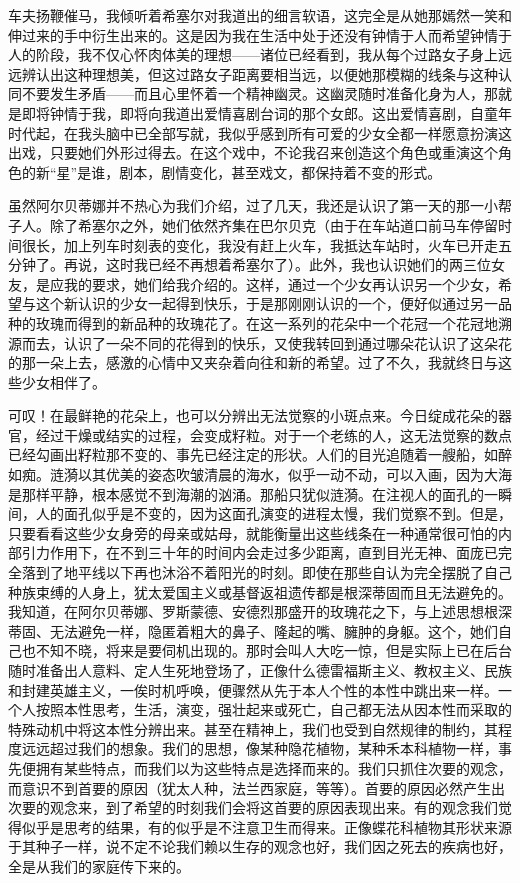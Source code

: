 \par 车夫扬鞭催马，我倾听着希塞尔对我道出的细言软语，这完全是从她那嫣然一笑和伸过来的手中衍生出来的。这是因为我在生活中处于还没有钟情于人而希望钟情于人的阶段，我不仅心怀肉体美的理想——诸位已经看到，我从每个过路女子身上远远辨认出这种理想美，但这过路女子距离要相当远，以便她那模糊的线条与这种认同不要发生矛盾——而且心里怀着一个精神幽灵。这幽灵随时准备化身为人，那就是即将钟情于我，即将向我道出爱情喜剧台词的那个女郎。这出爱情喜剧，自童年时代起，在我头脑中已全部写就，我似乎感到所有可爱的少女全都一样愿意扮演这出戏，只要她们外形过得去。在这个戏中，不论我召来创造这个角色或重演这个角色的新“星”是谁，剧本，剧情变化，甚至戏文，都保持着不变的形式。
\par 虽然阿尔贝蒂娜并不热心为我们介绍，过了几天，我还是认识了第一天的那一小帮子人。除了希塞尔之外，她们依然齐集在巴尔贝克（由于在车站道口前马车停留时间很长，加上列车时刻表的变化，我没有赶上火车，我抵达车站时，火车已开走五分钟了。再说，这时我已经不再想着希塞尔了）。此外，我也认识她们的两三位女友，是应我的要求，她们给我介绍的。这样，通过一个少女再认识另一个少女，希望与这个新认识的少女一起得到快乐，于是那刚刚认识的一个，便好似通过另一品种的玫瑰而得到的新品种的玫瑰花了。在这一系列的花朵中一个花冠一个花冠地溯源而去，认识了一朵不同的花得到的快乐，又使我转回到通过哪朵花认识了这朵花的那一朵上去，感激的心情中又夹杂着向往和新的希望。过了不久，我就终日与这些少女相伴了。
\par 可叹！在最鲜艳的花朵上，也可以分辨出无法觉察的小斑点来。今日绽成花朵的器官，经过干燥或结实的过程，会变成籽粒。对于一个老练的人，这无法觉察的数点已经勾画出籽粒那不变的、事先已经注定的形状。人们的目光追随着一艘船，如醉如痴。涟漪以其优美的姿态吹皱清晨的海水，似乎一动不动，可以入画，因为大海是那样平静，根本感觉不到海潮的汹涌。那船只犹似涟漪。在注视人的面孔的一瞬间，人的面孔似乎是不变的，因为这面孔演变的进程太慢，我们觉察不到。但是，只要看看这些少女身旁的母亲或姑母，就能衡量出这些线条在一种通常很可怕的内部引力作用下，在不到三十年的时间内会走过多少距离，直到目光无神、面庞已完全落到了地平线以下再也沐浴不着阳光的时刻。即使在那些自认为完全摆脱了自己种族束缚的人身上，犹太爱国主义或基督返祖遗传都是根深蒂固而且无法避免的。我知道，在阿尔贝蒂娜、罗斯蒙德、安德烈那盛开的玫瑰花之下，与上述思想根深蒂固、无法避免一样，隐匿着粗大的鼻子、隆起的嘴、臃肿的身躯。这个，她们自己也不知不晓，将来是要伺机出现的。那时会叫人大吃一惊，但是实际上已在后台随时准备出人意料、定人生死地登场了，正像什么德雷福斯主义、教权主义、民族和封建英雄主义，一俟时机呼唤，便骤然从先于本人个性的本性中跳出来一样。一个人按照本性思考，生活，演变，强壮起来或死亡，自己都无法从因本性而采取的特殊动机中将这本性分辨出来。甚至在精神上，我们也受到自然规律的制约，其程度远远超过我们的想象。我们的思想，像某种隐花植物，某种禾本科植物一样，事先便拥有某些特点，而我们以为这些特点是选择而来的。我们只抓住次要的观念，而意识不到首要的原因（犹太人种，法兰西家庭，等等）。首要的原因必然产生出次要的观念来，到了希望的时刻我们会将这首要的原因表现出来。有的观念我们觉得似乎是思考的结果，有的似乎是不注意卫生而得来。正像蝶花科植物其形状来源于其种子一样，说不定不论我们赖以生存的观念也好，我们因之死去的疾病也好，全是从我们的家庭传下来的。
